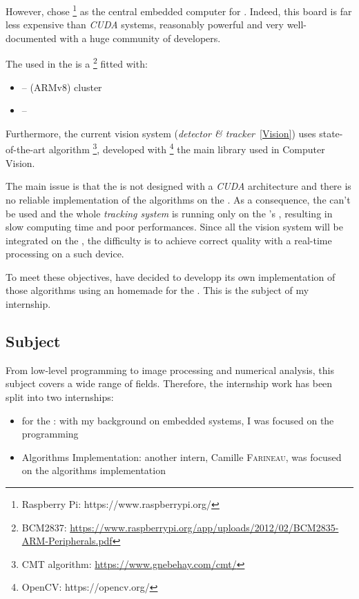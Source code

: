 However, \groupname{} chose \rasp\footnote{Raspberry Pi: https://www.raspberrypi.org/} as the central embedded computer for \iBubble. Indeed, this board is far less expensive than \emph{CUDA} systems, reasonably powerful and very well-documented with a huge community of developers.\par

The  used in the \rasp{} is a  \bcm{}\footnote{BCM2837: \url{https://www.raspberrypi.org/app/uploads/2012/02/BCM2835-ARM-Peripherals.pdf}} fitted with:
\begin{itemize}
\item {} --  (ARMv8) cluster
\item {} -- \vc{}
\end{itemize}

Furthermore, the current vision system (\emph{detector \& tracker}~\ref{Vision}) uses state-of-the-art algorithm \footnote{CMT algorithm: \url{https://www.gnebehay.com/cmt/}}, developed with \footnote{OpenCV: https://opencv.org/} the main library used in Computer Vision.

The main issue is that the \bcm{} is not designed with a \emph{CUDA} architecture and there is no reliable implementation of the algorithms on the \rasp. As a consequence, the \vc{} can't be used and the whole \emph{tracking system} is running only on the \rasp's , resulting in slow computing time and poor performances. Since all the vision system will be integrated on the \rasp, the difficulty is to achieve correct quality with a real-time processing on a such device.

To meet these objectives, \groupname{} have decided to developp its own implementation of those algorithms using an homemade  for the \vc. This is the subject of my internship.


\subsection{Subject}

From low-level programming to image processing and numerical analysis, this subject covers a wide range of fields. Therefore, the internship work has been split into two internships:

\begin{itemize}
\item {} for the : with my background on embedded systems, I was focused on the \vc{} programming
\item Algorithms Implementation: another intern, Camille \textsc{Farineau}, was focused on the  algorithms implementation
\end{itemize}


